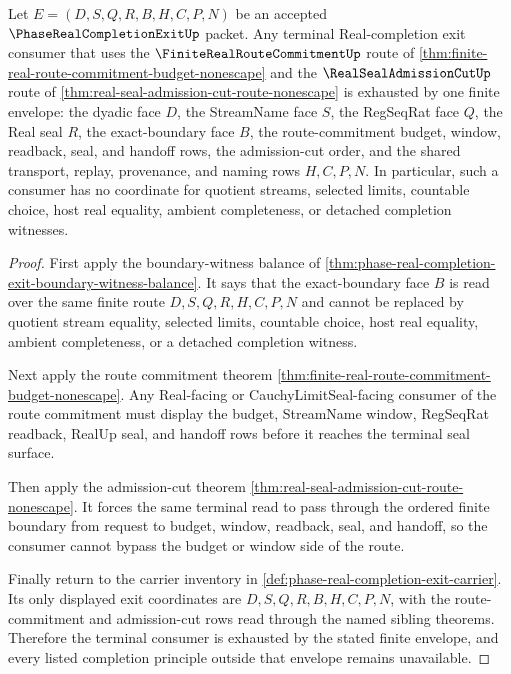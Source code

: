 \begin{theorem}
\label{thm:phase-real-completion-exit-terminal-envelope-exactness}
Let $E=(D,S,Q,R,B,H,C,P,N)$ be an accepted $\PhaseRealCompletionExitUp$ packet. Any terminal Real-completion exit consumer that uses the $\FiniteRealRouteCommitmentUp$ route of \autoref{thm:finite-real-route-commitment-budget-nonescape} and the $\RealSealAdmissionCutUp$ route of \autoref{thm:real-seal-admission-cut-route-nonescape} is exhausted by one finite envelope: the dyadic face $D$, the StreamName face $S$, the RegSeqRat face $Q$, the Real seal $R$, the exact-boundary face $B$, the route-commitment budget, window, readback, seal, and handoff rows, the admission-cut order, and the shared transport, replay, provenance, and naming rows $H,C,P,N$. In particular, such a consumer has no coordinate for quotient streams, selected limits, countable choice, host real equality, ambient completeness, or detached completion witnesses.
\end{theorem}
\begin{proof}
First apply the boundary-witness balance of \autoref{thm:phase-real-completion-exit-boundary-witness-balance}. It says that the exact-boundary face $B$ is read over the same finite route $D,S,Q,R,H,C,P,N$ and cannot be replaced by quotient stream equality, selected limits, countable choice, host real equality, ambient completeness, or a detached completion witness.

Next apply the route commitment theorem \autoref{thm:finite-real-route-commitment-budget-nonescape}. Any Real-facing or CauchyLimitSeal-facing consumer of the route commitment must display the budget, StreamName window, RegSeqRat readback, RealUp seal, and handoff rows before it reaches the terminal seal surface.

Then apply the admission-cut theorem \autoref{thm:real-seal-admission-cut-route-nonescape}. It forces the same terminal read to pass through the ordered finite boundary from request to budget, window, readback, seal, and handoff, so the consumer cannot bypass the budget or window side of the route.

Finally return to the carrier inventory in \autoref{def:phase-real-completion-exit-carrier}. Its only displayed exit coordinates are $D,S,Q,R,B,H,C,P,N$, with the route-commitment and admission-cut rows read through the named sibling theorems. Therefore the terminal consumer is exhausted by the stated finite envelope, and every listed completion principle outside that envelope remains unavailable.
\end{proof}

